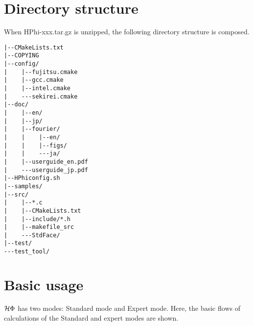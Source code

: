%
%
%
%
%
%
%
%

\section{Directory structure}
When HPhi-xxx.tar.gz is unzipped, the following directory structure is composed.
 
\begin{verbatim}
|--CMakeLists.txt
|--COPYING
|--config/
|    |--fujitsu.cmake
|    |--gcc.cmake
|    |--intel.cmake
|    ---sekirei.cmake
|--doc/
|    |--en/
|    |--jp/
|    |--fourier/
|    |    |--en/
|    |    |--figs/
|    |    ---ja/
|    |--userguide_en.pdf
|    ---userguide_jp.pdf
|--HPhiconfig.sh
|--samples/
|--src/
|    |--*.c
|    |--CMakeLists.txt
|    |--include/*.h
|    |--makefile_src
|    ---StdFace/
|--test/
---test_tool/
\end{verbatim}

\section{Basic usage}
$\mathcal{H} \Phi$ has two modes: Standard mode and Expert mode.
Here, the basic flows of calculations of the Standard and expert modes are shown.

